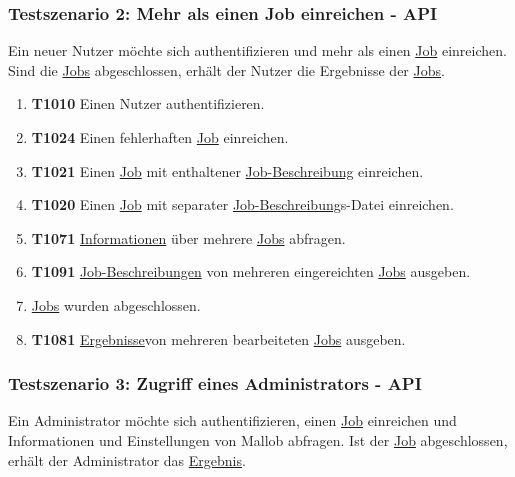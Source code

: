 \subsubsection{Testszenario 2: Mehr als einen Job einreichen - API}
Ein neuer \gls{Nutzer} möchte sich authentifizieren und mehr als einen \hyperref[B:Jobs]{Job} einreichen. Sind die \hyperref[B:Jobs]{Jobs} abgeschlossen, erhält der Nutzer die Ergebnisse der \hyperref[B:Jobs]{Jobs}.

\begin{enumerate}
        
    \item \textbf{T1010} Einen \gls{Nutzer} authentifizieren.
    
    \item \textbf{T1024} Einen fehlerhaften \hyperref[B:Jobs]{Job} einreichen.
        
    \item \textbf{T1021} Einen \hyperref[B:Jobs]{Job} mit enthaltener \hyperref[B:Job-Beschreibung]{Job-Beschreibung} einreichen.
    
    \item \textbf{T1020} Einen \hyperref[B:Jobs]{Job} mit separater \hyperref[B:Job-Beschreibung]{Job-Beschreibung}s-Datei einreichen. 
    
    \item \textbf{T1071} \hyperref[B:Job-Informationen]{Informationen} über mehrere \hyperref[B:Jobs]{Jobs} abfragen. 
    
    \item \textbf{T1091} \hyperref[B:Job-Beschreibung]{Job-Beschreibungen} von mehreren eingereichten \hyperref[B:Jobs]{Jobs} ausgeben.
    
    \item \hyperref[B:Jobs]{Jobs} wurden abgeschlossen.
    
    \item \textbf{T1081} \hyperref[B:Job-Ergebnis]{Ergebnisse}von mehreren bearbeiteten \hyperref[B:Jobs]{Jobs} ausgeben. 
\end{enumerate}

\subsubsection{Testszenario 3: Zugriff eines Administrators - API}
Ein \gls{Administrator} möchte sich authentifizieren, einen  \hyperref[B:Jobs]{Job} einreichen und Informationen und Einstellungen von \gls{Mallob} abfragen. Ist der  \hyperref[B:Jobs]{Job} abgeschlossen, erhält der \gls{Administrator} das \hyperref[B:Job-Ergebnis]{Ergebnis}.


